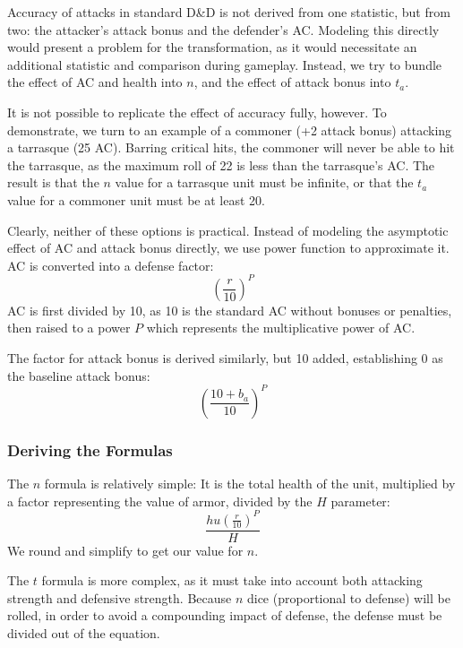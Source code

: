\documentclass[twocolumn]{article}
\begin{document}
Accuracy of attacks in standard D\&D is not derived from one statistic,
but from two: the attacker's attack bonus and the defender's AC.
Modeling this directly would present a problem for the transformation,
as it would necessitate an additional statistic and comparison during gameplay.
Instead, we try to bundle the effect of AC and health into $n$,
and the effect of attack bonus into $t_a$.

It is not possible to replicate the effect of accuracy fully, however.
To demonstrate, we turn to an example of a commoner (+2 attack bonus)
attacking a tarrasque (25 AC).
Barring critical hits, the commoner will never be able to hit the tarrasque,
as the maximum roll of 22 is less than the tarrasque's AC.
The result is that the $n$ value for a tarrasque unit must be infinite,
or that the $t_a$ value for a commoner unit must be at least 20.

Clearly, neither of these options is practical.
Instead of modeling the asymptotic effect of AC and attack bonus directly,
we use power function to approximate it.
AC is converted into a defense factor:
\[
    \left(\frac{r}{10}\right)^P
\]
AC is first divided by 10,
as 10 is the standard AC without bonuses or penalties,
then raised to a power $P$ which represents the multiplicative power of AC.

The factor for attack bonus is derived similarly,
but 10 added, establishing 0 as the baseline attack bonus:
\[
    \left(\frac{10 + b_a}{10}\right)^P
\]

\subsubsection{Deriving the Formulas}

The $n$ formula is relatively simple:
It is the total health of the unit,
multiplied by a factor representing the value of armor,
divided by the $H$ parameter:
\[
    \frac
        {h u (\frac{r}{10})^P}
        {H}
\]
We round and simplify to get our value for $n$.

The $t$ formula is more complex,
as it must take into account both attacking strength and defensive strength.
Because $n$ dice (proportional to defense) will be rolled,
in order to avoid a compounding impact of defense,
the defense must be divided out of the equation.
\end{document}
